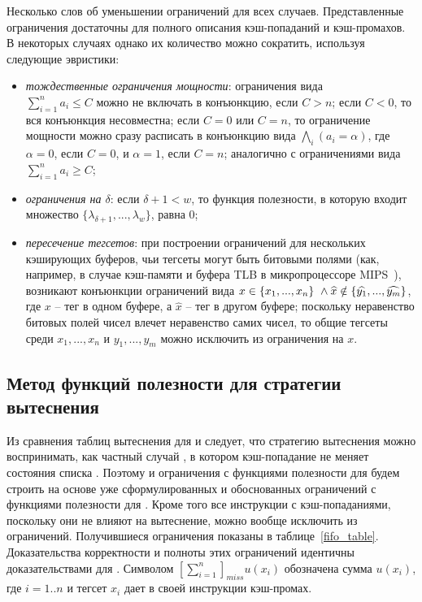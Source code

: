 Несколько слов об уменьшении ограничений для всех случаев.
Представленные ограничения достаточны для полного описания
кэш-попаданий и кэш-промахов. В некоторых случаях однако их
количество можно сократить, используя следующие эвристики:
\begin{itemize}
\item \emph{тождественные ограничения мощности}: ограничения вида\\
$\sum_{i=1}^n a_i \leqslant C$ можно не включать в конъюнкцию, если
$C > n$; если $C < 0$, то вся конъюнкция несовместна; если $C = 0$
или $C = n$, то ограничение мощности можно сразу расписать в
конъюнкцию вида $\bigwedge_i (a_i = \alpha)$, где $\alpha = 0$, если
$C = 0$, и $\alpha = 1$, если $C = n$; аналогично с ограничениями
вида $\sum_{i=1}^n a_i \geqslant C$;
\item \emph{ограничения на $\delta$}: если $\delta + 1 < w$, то
функция полезности, в которую входит множество
$\{\lambda_{\delta+1}, ..., \lambda_w\}$, равна 0;
\item \emph{пересечение тегсетов}: при построении ограничений для
нескольких кэширующих буферов, чьи тегсеты могут быть битовыми
полями (как, например, в случае кэш-памяти и буфера TLB в
микропроцессоре MIPS~\cite{mips64_III}), возникают конъюнкции
ограничений вида $x \in \{x_1, ..., x_n\}~\wedge\\\widehat{x} \notin
\{ \widehat{y_1}, ..., \widehat{y_m} \}$, где $x$ -- тег в одном
буфере, а $\widehat{x}$ -- тег в другом буфере; поскольку
неравенство битовых полей чисел влечет неравенство самих чисел, то
общие тегсеты среди $x_1, ..., x_n$ и $y_1, ..., y_m$ можно
исключить из ограничения на $x$.
\end{itemize}


\subsection{Метод функций полезности для стратегии
вытеснения \FIFO}

Из сравнения таблиц вытеснения для \FIFO и \LRU следует, что
стратегию вытеснения \FIFO можно воспринимать, как частный случай
\LRU, в котором кэш-попадание не меняет состояния списка \LRU.
Поэтому и ограничения с функциями полезности для \FIFO будем строить
на основе уже сформулированных и обоснованных ограничений с
функциями полезности для \LRU. Кроме того все инструкции с
кэш-попаданиями, поскольку они не влияют на вытеснение, можно вообще
исключить из ограничений. Получившиеся ограничения показаны в
таблице~\ref{fifo_table}. Доказательства корректности и полноты этих
ограничений идентичны доказательствами для \LRU. Символом
$[\sum\limits^n_{i=1}]_{miss} u(x_i)$ обозначена сумма $u(x_i)$, где
$i=1..n$ и тегсет $x_i$ дает в своей инструкции кэш-промах.


